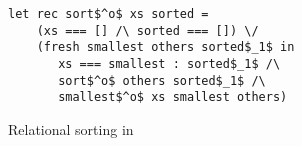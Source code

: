 \begin{figure}[h!]
  \centering
    \begin{lstlisting}[frame=tb]
  let rec sort$^o$ xs sorted =
    (xs === [] /\ sorted === []) \/
    (fresh smallest others sorted$_1$ in
       xs === smallest : sorted$_1$ /\
       sort$^o$ others sorted$_1$ /\
       smallest$^o$ xs smallest others)
    \end{lstlisting}
  \caption{Relational sorting in \mk}
  \label{fig:sorto}
\end{figure}
